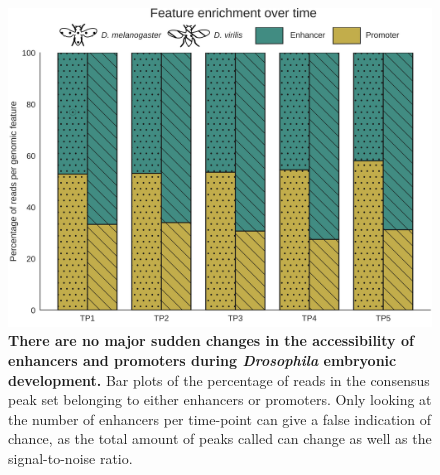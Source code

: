 \begin{figure}[H]
    \center
    \includegraphics[width=0.8\linewidth]{ch.hourglass/images/feature_enrichment.png}
    \caption{\textbf{There are no major sudden changes in the accessibility of enhancers and promoters during \textit{Drosophila} embryonic development.} Bar plots of the percentage of reads in the consensus peak set belonging to either enhancers or promoters. Only looking at the number of enhancers per time-point can give a false indication of chance, as the total amount of peaks called can change as well as the signal-to-noise ratio.}
    \label{fig:peak_enrichment}
\end{figure}

\closesupplement
